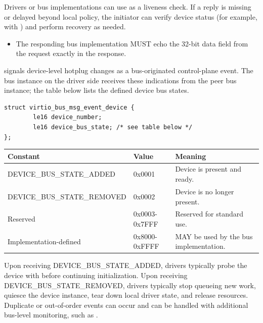 Drivers or bus implementations can use  as a liveness check. If a
reply is missing or delayed beyond local policy, the initiator can verify
device status (for example, with ) and perform
recovery as needed.

\begin{itemize}
  \item The responding bus implementation MUST echo the 32-bit data field from
        the request exactly in the  response.
\end{itemize}


 signals device-level hotplug changes as a bus-originated
control-plane event. The bus instance on the driver side receives these
indications from the peer bus instance; the table below lists the defined
device bus states.

\begin{lstlisting}
struct virtio_bus_msg_event_device {
        le16 device_number;
        le16 device_bus_state; /* see table below */
};
\end{lstlisting}

\begin{tabular}{|l|l|p{7cm}|}
\hline
Constant & Value & Meaning \\
\hline
DEVICE\_BUS\_STATE\_ADDED    & 0x0001 & Device is present and ready. \\
DEVICE\_BUS\_STATE\_REMOVED  & 0x0002 & Device is no longer present. \\
Reserved                    & 0x0003-0x7FFF & Reserved for standard use. \\
Implementation-defined      & 0x8000-0xFFFF & MAY be used by the bus implementation. \\
\hline
\end{tabular}

Upon receiving DEVICE\_BUS\_STATE\_ADDED, drivers typically probe the device
with  before continuing initialization. Upon receiving
DEVICE\_BUS\_STATE\_REMOVED, drivers typically stop queueing new work, quiesce
the device instance, tear down local driver state, and release resources.
Duplicate or out-of-order events can occur and can be handled with additional
bus-level monitoring, such as .


